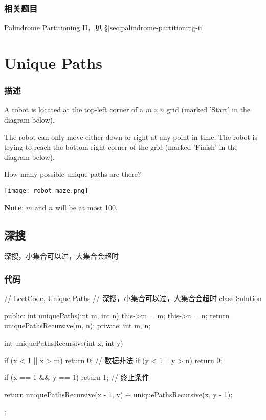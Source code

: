 \subsubsection{相关题目}

\begindot
\item Palindrome Partitioning II，见 \S \ref{sec:palindrome-partitioning-ii}
\myenddot


\section{Unique Paths} %
\label{sec:unique-paths}


\subsubsection{描述}
A robot is located at the top-left corner of a $m \times n$ grid (marked 'Start' in the diagram below).

The robot can only move either down or right at any point in time. The robot is trying to reach the bottom-right corner of the grid (marked 'Finish' in the diagram below).

How many possible unique paths are there?

\begin{center}
\texttt{[image: robot-maze.png]}\\
\label{fig:unique-paths}
\end{center}

\textbf{Note}: $m$ and $n$ will be at most 100.


\subsection{深搜}
深搜，小集合可以过，大集合会超时

\subsubsection{代码}
\begin{Code}
// LeetCode, Unique Paths
// 深搜，小集合可以过，大集合会超时
class Solution {
public:
    int uniquePaths(int m, int n) {
        this->m = m;
        this->n = n;
        return uniquePathsRecursive(m, n);
    }
private:
    int m, n;

    int uniquePathsRecursive(int x, int y) {
        if (x < 1 || x > m) return 0; // 数据非法
        if (y < 1 || y > n) return 0;

        if (x == 1 && y == 1) return 1; // 终止条件

        return uniquePathsRecursive(x - 1, y) + uniquePathsRecursive(x, y - 1);
    }
};
\end{Code}


